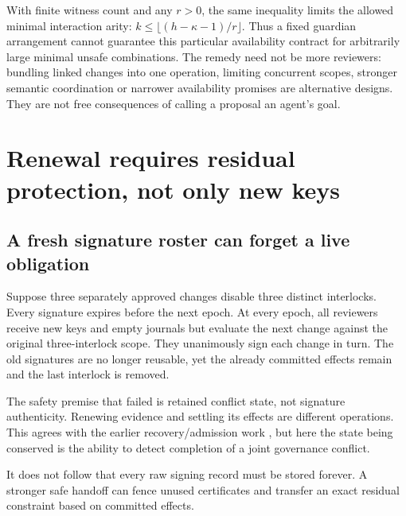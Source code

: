 \documentclass[11pt,a4paper]{article}
\theoremstyle{definition}\newtheorem{definition}{Definition}
\begin{document}
With finite witness count and any $r>0$, the same inequality limits the allowed minimal interaction arity: $k\le\lfloor(h-\kappa-1)/r\rfloor$. Thus a fixed guardian arrangement cannot guarantee this particular availability contract for arbitrarily large minimal unsafe combinations. The remedy need not be more reviewers: bundling linked changes into one operation, limiting concurrent scopes, stronger semantic coordination or narrower availability promises are alternative designs. They are not free consequences of calling a proposal an agent's goal.

\section{Renewal requires residual protection, not only new keys}
\label{sec:renewal}
\subsection{A fresh signature roster can forget a live obligation}
Suppose three separately approved changes disable three distinct interlocks. Every signature expires before the next epoch. At every epoch, all reviewers receive new keys and empty journals but evaluate the next change against the original three-interlock scope. They unanimously sign each change in turn. The old signatures are no longer reusable, yet the already committed effects remain and the last interlock is removed.

The safety premise that failed is retained conflict state, not signature authenticity. Renewing evidence and settling its effects are different operations. This agrees with the earlier recovery/admission work \cite{rac13}, but here the state being conserved is the ability to detect completion of a joint governance conflict.

It does not follow that every raw signing record must be stored forever. A stronger safe handoff can fence unused certificates and transfer an exact residual constraint based on committed effects.
\end{document}
